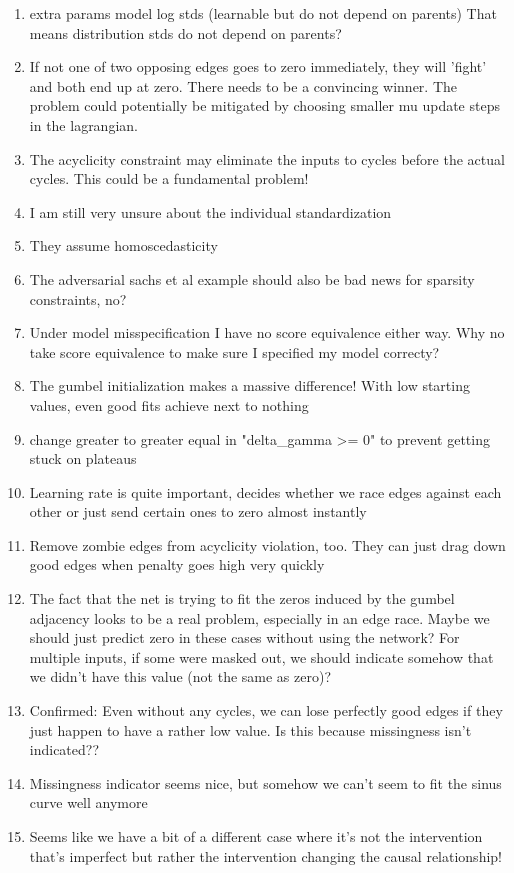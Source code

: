 \documentclass{article}
\begin{document}
\begin{enumerate}
    \item extra params model log stds (learnable but do not depend on parents) That means distribution stds do not depend on parents?
    \item If not one of two opposing edges goes to zero immediately, they will 'fight' and both end up at zero. There needs to be a convincing winner. The problem could potentially be mitigated by choosing smaller mu update steps in the lagrangian.
    \item The acyclicity constraint may eliminate the inputs to cycles before the actual cycles. This could be a fundamental problem!
    \item I am still very unsure about the individual standardization
    \item They assume homoscedasticity
    \item The adversarial sachs et al example should also be bad news for sparsity constraints, no?
    \item Under model misspecification I have no score equivalence either way. Why no take score equivalence to make sure I specified my model correcty?
    \item The gumbel initialization makes a massive difference! With low starting values, even good fits achieve next to nothing
    \item change greater to greater equal in "delta\_gamma >= 0" to prevent getting stuck on plateaus
    \item Learning rate is quite important, decides whether we race edges against each other or just send certain ones to zero almost instantly
    \item Remove zombie edges from acyclicity violation, too. They can just drag down good edges when penalty goes high very quickly
    \item The fact that the net is trying to fit the zeros induced by the gumbel adjacency looks to be a real problem, especially in an edge race. Maybe we should just predict zero in these cases without using the network? For multiple inputs, if some were masked out, we should indicate somehow that we didn't have this value (not the same as zero)?
    \item Confirmed: Even without any cycles, we can lose perfectly good edges if they just happen to have a rather low value. Is this because missingness isn't indicated??
    \item Missingness indicator seems nice, but somehow we can't seem to fit the sinus curve well anymore
    \item Seems like we have a bit of a different case where it's not the intervention that's imperfect but rather the intervention changing the causal relationship!
\end{enumerate}
\end{document}
